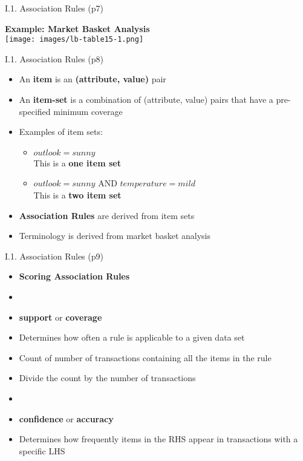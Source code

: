 \documentclass[handout]{beamer}
\newcommand{\strong}[1]{\textbf{\color{teal} #1}}
\newcommand{\stronger}[1]{\textbf{\color{purple} #1}}
\begin{document}
\begin{frame}{I.1. Association Rules (p7)}
\begin{center}
\textbf{Example: Market Basket Analysis}\\
\bigskip
\texttt{[image: images/lb-table15-1.png]} \\
\cite[Table 15.1]{LB3:2011}
\end{center}
\end{frame}
\begin{frame}{I.1. Association Rules (p8)}
\begin{itemize}
\item An \stronger{item} is an \stronger{(attribute, value)} pair
\item An \stronger{item-set} is a combination of (attribute, value) pairs that have a pre-specified minimum coverage
\item Examples of item sets:
	\begin{itemize}
	\item $ outlook = sunny $  \\This is a \strong{one item set}
	\item $ outlook = sunny  $ AND $ temperature =  mild $ \\ This is a \strong{two item set}
	\end{itemize}
\item \stronger{Association Rules} are derived from item sets
\item Terminology is derived from market basket analysis
\end{itemize}
\end{frame}
\begin{frame}{I.1. Association Rules (p9)}
\begin{itemize}
\item[] \textbf{Scoring Association Rules}
\item[]
\item[] \stronger{support} or \stronger{coverage}
\item Determines how often a rule is applicable to a given data set
\item Count of number of transactions containing all the items in the rule
\item Divide the count by the number of transactions
\item[]
\item[] \stronger{confidence} or \stronger{accuracy}
\item Determines how frequently items in the RHS appear in transactions with a specific LHS
\end{itemize}
\end{frame}
\end{document}
